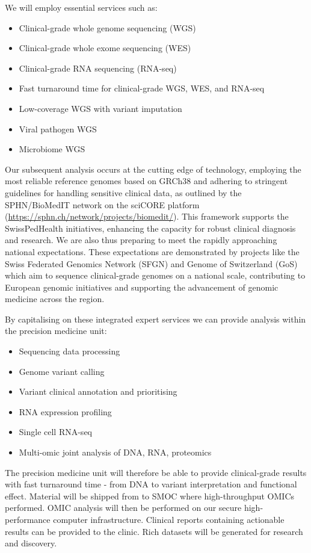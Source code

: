 We will employ essential services such as:
\begin{itemize}
    \item Clinical-grade whole genome sequencing (WGS)
    \item Clinical-grade whole exome sequencing (WES)
    \item Clinical-grade RNA sequencing (RNA-seq)
    \item Fast turnaround time for clinical-grade WGS, WES, and RNA-seq
    \item Low-coverage WGS with variant imputation
    \item Viral pathogen WGS
    \item Microbiome WGS
\end{itemize}

Our subsequent analysis  occurs at the cutting edge of technology, employing the most reliable reference genomes based on GRCh38 and adhering to stringent guidelines for handling sensitive clinical data, as outlined by the SPHN/BioMedIT network on the sciCORE platform (\url{https://sphn.ch/network/projects/biomedit/}). This framework supports the SwissPedHealth initiatives, enhancing the capacity for robust clinical diagnosis and research. 
We are also thus preparing to meet the rapidly approaching national expectations.
These expectations are demonstrated by projects like the Swiss Federated Genomics Network (SFGN) and Genome of Switzerland (GoS) which aim to sequence clinical-grade genomes on a national scale, contributing to European genomic initiatives and supporting the advancement of genomic medicine across the region.

By capitalising on these integrated expert services we can provide analysis within the precision medicine unit:
\begin{itemize}
\item Sequencing data processing
\item Genome variant calling
\item Variant clinical annotation and prioritising
\item RNA expression profiling
\item Single cell RNA-seq
\item Multi-omic joint analysis of DNA, RNA, proteomics
\end{itemize}

The precision medicine unit will therefore be able to provide clinical-grade results with fast turnaround time - 
from DNA to variant interpretation and functional effect.
Material will be shipped from \kispi to SMOC where high-throughput OMICs performed.
OMIC analysis will then be performed on our secure  high-performance computer infrastructure.
Clinical reports containing actionable results can be provided to the clinic.
Rich datasets will be generated for research and discovery.
